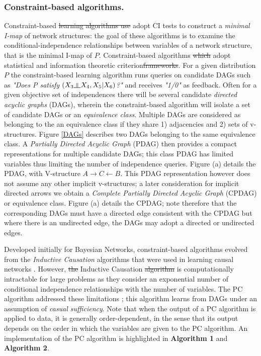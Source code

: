 \documentclass[7pt]{article}
\newcommand{\inperp}{\rotatebox[origin=c]{90}{$\models$}}
\begin{document}
\subsubsection{Constraint-based  algorithms.}	
Constraint-based \st{learning algorithms use} adopt CI tests to construct a \emph{minimal I-map} of network structures: the goal of these algorithms is to examine the conditional-independence relationships  between variables of a network structure, that is the minimal I-map of $P$. {Constraint-based algorithms} \st{which} adopt statistical and information theoretic criterion\st{frameworks}. For a given distribution $P$ the constraint-based learning algorithm runs queries on candidate DAGs such as \emph{"Does P satisfy $(X_3 \inperp X_4,X_5 | X_6)$?"} and receives \emph{"1/0"} as feedback. Often for a given objective set of independences there will be several candidate \emph{directed acyclic graphs} (DAGs), wherein the constraint-based algorithm will isolate a set of candidate DAGs or an \emph{equivalence class}. Multiple DAGs are considered as belonging to the an equivalence class if they share 1) adjacencies and 2) sets of v-structures. Figure \ref{DAGs} describes two DAGs belonging to the same equivalence class. A \emph{Partially Directed Acyclic Graph} (PDAG) then provides a compact representations for multiple candidate DAGs; this class PDAG has limited variables thus limiting the number of independence queries. Figure (a) details the PDAG, with  V-structure $A \rightarrow C \leftarrow B$. This PDAG representation however does not assume any other implicit v-structures; a later consideration for implicit directed arrows we obtain a \emph{Complete Partially Directed Acyclic Graph} (CPDAG) or equivalence class. Figure (a) details the CPDAG; note therefore that the corresponding DAGs must have a directed edge consistent with the CPDAG but where there is an undirected edge, the DAGs may adopt a directed or undirected edges.

Developed initially for Bayesian Networks, constraint-based algorithms evolved from the \emph{Inductive Causation} algorithms that were used in learning causal networks \cite{verma1991equivalence}. However,  \st{the}  {Inductive Causation} \st{algorithm} is computationally intractable for large problems as they consider an exponential number of conditional independence relationships with the number of variables. The PC algorithm addressed these limitations \cite{spirtes1991algorithm, colombo2014order, spirtes2000causation}; this algorithm learns from  DAGs under an assumption of \emph{casual sufficiency}. Note that when the output of a PC algorithm is applied to data, it is generally order-dependent, in the sense that its output depends on the order in which the variables are given to the PC algorithm. An implementation of the PC algorithm is highlighted in \textbf{Algorithm 1} and \textbf{Algorithm 2}. 
	
\end{document}

